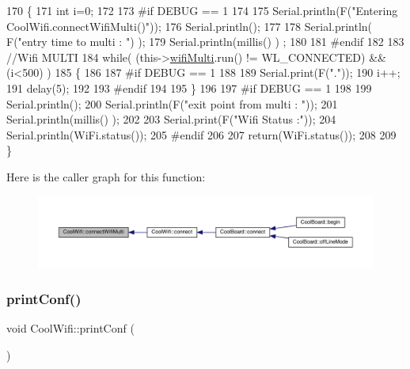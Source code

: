 \begin{DoxyCode}
170 \{
171     \textcolor{keywordtype}{int} i=0;
172 
173 \textcolor{preprocessor}{#if DEBUG == 1 }
174 
175     Serial.println(F(\textcolor{stringliteral}{"Entering CoolWifi.connectWifiMulti()"}));
176     Serial.println();
177     
178     Serial.println( F(\textcolor{stringliteral}{"entry time to multi : "}) );
179     Serial.println(millis() ) ;
180 
181 \textcolor{preprocessor}{#endif}
182     
183     \textcolor{comment}{//Wifi MULTI}
184     \textcolor{keywordflow}{while}( (this->\hyperlink{classCoolWifi_a7862a8c0d7239877e2956c14a368aab8}{wifiMulti}.run() != WL\_CONNECTED) && (i<500)  ) 
185     \{
186 
187 \textcolor{preprocessor}{    #if DEBUG == 1}
188 
189         Serial.print(F(\textcolor{stringliteral}{"."}));
190         i++;
191         delay(5);
192 
193 \textcolor{preprocessor}{    #endif}
194 
195         \}   
196 
197 \textcolor{preprocessor}{#if DEBUG == 1 }
198 
199     Serial.println();   
200     Serial.println(F(\textcolor{stringliteral}{"exit point from multi : "}));
201     Serial.println(millis() );
202     
203     Serial.print(F(\textcolor{stringliteral}{"Wifi Status :"}));
204     Serial.println(WiFi.status());
205 \textcolor{preprocessor}{#endif}
206 
207     \textcolor{keywordflow}{return}(WiFi.status());
208 
209 \}
\end{DoxyCode}
Here is the caller graph for this function\+:
\nopagebreak
\begin{figure}[H]
\begin{center}
\leavevmode
\includegraphics[width=350pt]{classCoolWifi_a419de92d738f14b7444cf822b3ab0070_icgraph}
\end{center}
\end{figure}
\mbox{\label{classCoolWifi_a9e6105c6d13d35ec510f6633da9e0223}} 
\subsubsection{\texorpdfstring{print\+Conf()}{printConf()}}
{\footnotesize\ttfamily void Cool\+Wifi\+::print\+Conf (\begin{DoxyParamCaption}{ }\end{DoxyParamCaption})}

